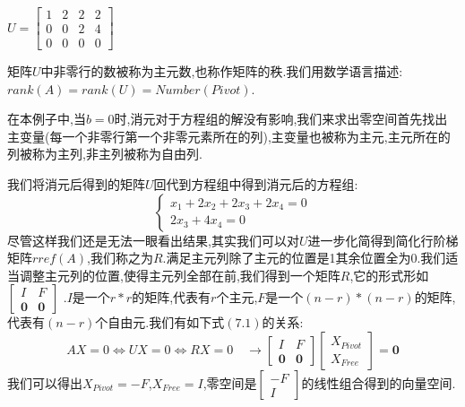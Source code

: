 \documentclass[oneside]{book}
\begin{document}
$U=\left[\begin{array}{cccc}1&2&2&2\\0&0&2&4\\0&0&0&0
\end{array}\right]$

矩阵$U$中非零行的数被称为主元数,也称作矩阵的秩.我们用数学语言描述:$rank(A)=rank(U)=Number(Pivot)$.

在本例子中,当$b=0$时,消元对于方程组的解没有影响,我们来求出零空间首先找出主变量(每一个非零行第一个非零元素所在的列),主变量也被称为主元,主元所在的列被称为主列,非主列被称为自由列.

我们将消元后得到的矩阵$U$回代到方程组中得到消元后的方程组:
$$\left\{\begin{array}{c}
	x_{1}+2x_{2}+2x_{3}+2x_{4}=0\\
    2x_{3}+4x_{4}=0
\end{array}\right.$$
\qquad 尽管这样我们还是无法一眼看出结果,其实我们可以对$U$进一步化简得到简化行阶梯矩阵$rref(A)$,我们称之为$R$.满足主元列除了主元的位置是1其余位置全为0.我们适当调整主元列的位置,使得主元列全部在前,我们得到一个矩阵$R$,它的形式形如$\left[\begin{array}{cc}
	I&F\\
	\textbf{0}&\textbf{0}
\end{array}\right]$ .$I$是一个$r*r$的矩阵,代表有$r$个主元,$F$是一个$(n-r)* (n-r)$的矩阵,代表有$(n-r)$个自由元.我们有如下式$(7.1)$的关系:
\begin{equation}
	AX=0\Leftrightarrow UX=0 \Leftrightarrow RX=0
	\quad \rightarrow \left[\begin{array}{cc}
		I&F\\
		\textbf{0}&\textbf{0}
	\end{array}\right]\left[\begin{array}{c}
	X_{Pivot}\\ X_{Free}
\end{array}\right]=\textbf{0}
\end{equation}
	\qquad 我们可以得出$X_{Pivot}=-F$,$X_{Free}=I$,零空间是$\left[\begin{array}{c}
	-F\\I
\end{array}\right]$的线性组合得到的向量空间.
\end{document}
